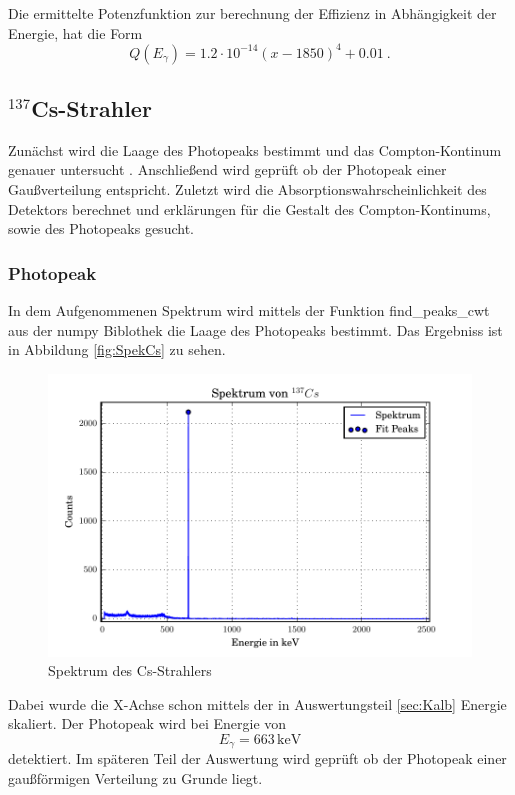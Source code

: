 Die ermittelte Potenzfunktion zur berechnung der Effizienz in Abhängigkeit der Energie, hat die Form
\begin{equation}
  Q(E_\gamma)= 1.2 \cdot 10^{-14} \left( x - 1850 \right)^4 + 0.01 \ .
  \label{eqn:QCs}
\end{equation}


\subsection{$^{137}$Cs-Strahler}
Zunächst wird die Laage des Photopeaks bestimmt und das Compton-Kontinum genauer untersucht . Anschließend wird geprüft ob der Photopeak einer Gaußverteilung entspricht. Zuletzt wird die Absorptionswahrscheinlichkeit des Detektors berechnet und erklärungen für die Gestalt des Compton-Kontinums, sowie des Photopeaks gesucht.


\subsubsection{Photopeak}
In dem Aufgenommenen Spektrum wird mittels der Funktion find\_peaks\_cwt aus der numpy Biblothek die Laage des Photopeaks bestimmt. Das Ergebniss ist in Abbildung \ref{fig:SpekCs} zu sehen.

\begin{figure}
  \centering
  \includegraphics[width=\textwidth]{./build/SpektCS.pdf}
  \caption{Spektrum des Cs-Strahlers}
  \label{fig:SpekCS}
\end{figure}

Dabei wurde die X-Achse schon mittels der in Auswertungsteil \ref{sec:Kalb} Energie skaliert. Der Photopeak wird bei Energie von
\begin{equation}
  E_\gamma = 663 \, \text{keV}
  \label{eqn:CsPhoto}
\end{equation}
detektiert. Im späteren Teil der Auswertung wird geprüft ob der Photopeak einer gaußförmigen Verteilung zu Grunde liegt.


